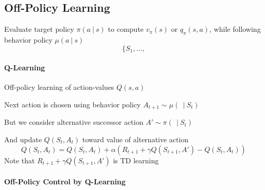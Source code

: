 \documentclass[10pt]{report}
\begin{document}
\subsection{Off-Policy Learning} Evaluate target policy $\pi(a\:|\:s)$ to compute $v_\pi(s)$ or $q_\pi(s,a)$, while following behavior policy $\mu(a\:|\:s)$
$$\{S_1,\ldots,$$ %
\paragraph{Q-Learning} Off-policy learning of action-values $Q(s,a)$
\begin{list}{}{}
	\item Next action is chosen using behavior policy $A_{t+1}\sim \mu(\:\:|\:S_t)$
	\item But we consider alternative successor action $A'\sim\pi(\:\:|\:S_t)$
	\item And update $Q(S_t,A_t)$ toward value of alternative action
	$$Q(S_t,A_t) = Q(S_t,A_t) + \alpha(R_{t+1} + \gamma Q(S_{t+1},A') - Q(S_t,A_t))$$
	Note that $R_{t+1} + \gamma Q(S_{t+1},A')$ is TD learning
\end{list}
\paragraph{Off-Policy Control by Q-Learning}
\end{document}
